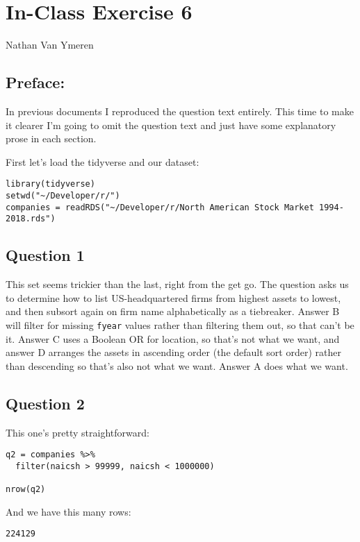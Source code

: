 \documentclass[11pt]{article}
\author{Nathan Van Ymeren}
\date{\today}
\title{}
\begin{document}
\section*{In-Class Exercise 6}
\label{sec:org8e7d508}
Nathan Van Ymeren
\subsection*{Preface:}
\label{sec:org9c33ca9}
In previous documents I reproduced the question text entirely.  This time to make it clearer I'm going to omit the question text and just have some explanatory prose in each section.

First let's load the tidyverse and our dataset:

\begin{verbatim}
library(tidyverse)
setwd("~/Developer/r/")
companies = readRDS("~/Developer/r/North American Stock Market 1994-2018.rds")
\end{verbatim}

\subsection*{Question 1}
\label{sec:orgfd54514}
This set seems trickier than the last, right from the get go.  The question asks us to determine how to list US-headquartered firms from highest assets to lowest, and then subsort again on firm name alphabetically as a tiebreaker.  Answer B will filter for missing \texttt{fyear} values rather than filtering them out, so that can't be it.  Answer C uses a Boolean OR for location, so that's not what we want, and answer D arranges the assets in ascending order (the default sort order) rather than descending so that's also not what we want.  Answer A does what we want.

\subsection*{Question 2}
\label{sec:orged37013}
This one's pretty straightforward:

\begin{verbatim}
q2 = companies %>%
  filter(naicsh > 99999, naicsh < 1000000)

nrow(q2)
\end{verbatim}

And we have this many rows:

\begin{verbatim}
224129
\end{verbatim}
\end{document}
